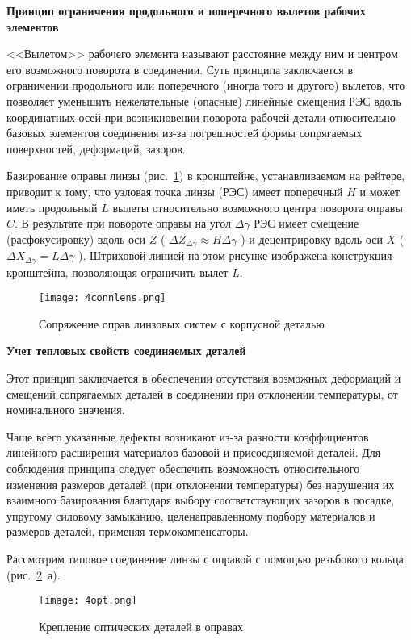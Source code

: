 \begin{flushleft}
\textbf{Принцип ограничения продольного и поперечного вылетов рабочих элементов}
\end{flushleft}

<<Вылетом>> рабочего элемента называют расстояние между ним и центром его возможного поворота в соединении. Суть принципа заключается в ограничении продольного или поперечного (иногда того и другого) вылетов, что позволяет уменьшить нежелательные (опасные) линейные смещения РЭС вдоль координатных осей при возникновении поворота рабочей детали относительно базовых элементов соединения из-за погрешностей формы сопрягаемых поверхностей, деформаций, зазоров.

Базирование оправы линзы (рис.~\ref{pic:4connlens}) в кронштейне, устанавливаемом на рейтере, приводит к тому, что узловая точка линзы (РЭС) имеет поперечный $ H $ и может иметь продольный $ L $ вылеты относительно возможного центра поворота оправы $ C $. В результате при повороте оправы на угол $ \Delta\gamma $  РЭС имеет смещение (расфокусировку) вдоль оси $ Z $ ( $ \Delta Z_{\Delta\gamma} \approx H\Delta\gamma$ ) и децентрировку вдоль оси $ X $ ( $ \Delta X_{\Delta\gamma} = L\Delta\gamma $ ). Штриховой линией на этом рисунке изображена конструкция кронштейна, позволяющая ограничить вылет $ L $.

\begin{figure}[h!]
	\caption{Сопряжение оправ линзовых систем с корпусной деталью}
	\texttt{[image: 4connlens.png]}
	\label{pic:4connlens}
\end{figure}

\begin{flushleft}
\textbf{Учет тепловых свойств соединяемых деталей}
\end{flushleft}

Этот принцип заключается в обеспечении отсутствия возможных деформаций и смещений сопрягаемых деталей в соединении при отклонении температуры, от номинального значения.

Чаще всего указанные дефекты возникают из-за разности коэффициентов линейного расширения материалов базовой и присоединяемой деталей. Для соблюдения принципа следует обеспечить возможность относительного изменения размеров деталей (при отклонении температуры) без нарушения их взаимного базирования благодаря выбору соответствующих зазоров в посадке, упругому силовому замыканию, целенаправленному подбору материалов и размеров деталей, применяя термокомпенсаторы.

Рассмотрим типовое соединение линзы с оправой с помощью резьбового кольца (рис.~\ref{pic:4opt}~а).
\begin{figure}[H]
	\caption{Крепление оптических деталей в оправах}
	\texttt{[image: 4opt.png]}
	\label{pic:4opt}
\end{figure}

